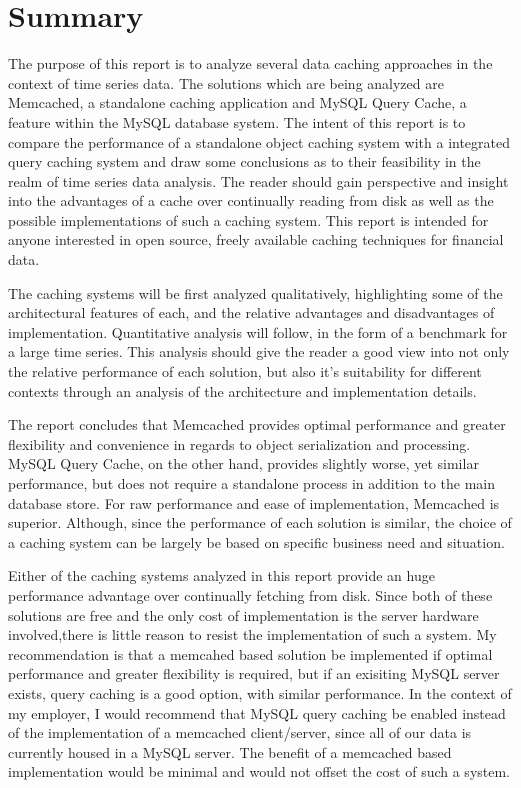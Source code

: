 \documentclass[ece]{uw-wkrpt}
\begin{document}
\section{Summary}

The purpose of this report is to analyze several data caching approaches in the context of time series data. 
The solutions which are being analyzed are Memcached, a standalone caching application and MySQL Query Cache, a feature within the MySQL database system. The intent of this report is to compare the performance of 
a standalone object caching system with a integrated query caching system and draw some conclusions as to their feasibility in the realm of time series data analysis. The reader should gain perspective and insight into the advantages of a cache over continually reading from disk as well as the possible implementations of such a caching system. This report is intended for anyone interested in open source, freely available caching techniques for financial data. 

The caching systems will be first analyzed qualitatively, highlighting some of the architectural features of each, and the relative advantages and disadvantages of implementation. Quantitative analysis will follow, in the form of a benchmark for a large time series. This analysis should give the reader a good view into not only the relative performance of each solution, but also it's suitability for different contexts through an analysis of the architecture and implementation details. 

The report concludes that Memcached provides optimal performance and greater flexibility and convenience in regards to object serialization and processing. MySQL Query Cache, on the other hand, provides slightly worse, yet similar performance, but does not require a standalone process in addition to the main database store. For raw performance and ease of implementation, Memcached is superior. Although, since the performance of each solution is similar, the choice of a caching system can be largely be based on specific business need and situation. 

Either of the caching systems analyzed in this report provide an huge performance advantage  over continually fetching from disk. Since both of these solutions are free and the only cost of implementation is the server hardware involved,there is little reason to resist  the implementation of such a system. My recommendation is that a memcahed based solution be implemented if optimal performance and greater flexibility is required, but if an exisiting MySQL server exists, query caching is a good option, with similar performance. In the context of my employer, I would recommend that MySQL query caching be enabled instead of the implementation of a memcached client/server, since all of our data is currently housed in a MySQL server. The benefit of a memcached based implementation would be minimal and would not offset the cost of such a system. 
\end{document}
